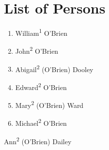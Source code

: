 \chapter{List of Persons}
\begin{enumerate}
	\item \label{per:William1OBrien} William\textsuperscript{1} O'Brien
	\item \label{per:John2OBrien} John\textsuperscript{2} O'Brien
	\item \label{per:Abigail2OBrien} Abigail\textsuperscript{2} (O'Brien) Dooley
	\item \label{per:Edward2OBrien} Edward\textsuperscript{2} O'Brien
	\item \label{per:Mary2OBrien} Mary\textsuperscript{2} (O'Brien) Ward
	\item \label{per:Michael2OBrien} Michael\textsuperscript{2} O'Brien
\end{enumerate}

Ann\textsuperscript{2} (O'Brien) Dailey